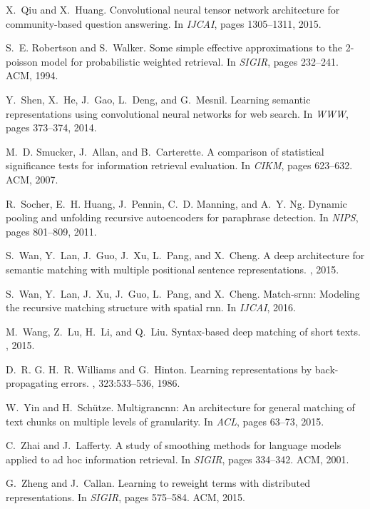 \documentclass{sig-alternate-05-2015}
\begin{document}
\begin{thebibliography}{10}
X.~Qiu and X.~Huang.
\newblock Convolutional neural tensor network architecture for community-based
  question answering.
\newblock In {\em IJCAI}, pages 1305--1311, 2015.

S.~E. Robertson and S.~Walker.
\newblock Some simple effective approximations to the 2-poisson model for
  probabilistic weighted retrieval.
\newblock In {\em SIGIR}, pages 232--241. ACM, 1994.

Y.~Shen, X.~He, J.~Gao, L.~Deng, and G.~Mesnil.
\newblock Learning semantic representations using convolutional neural networks
  for web search.
\newblock In {\em WWW}, pages 373--374, 2014.

M.~D. Smucker, J.~Allan, and B.~Carterette.
\newblock A comparison of statistical significance tests for information
  retrieval evaluation.
\newblock In {\em CIKM}, pages 623--632. ACM, 2007.

R.~Socher, E.~H. Huang, J.~Pennin, C.~D. Manning, and A.~Y. Ng.
\newblock Dynamic pooling and unfolding recursive autoencoders for paraphrase
  detection.
\newblock In {\em NIPS}, pages 801--809, 2011.

S.~Wan, Y.~Lan, J.~Guo, J.~Xu, L.~Pang, and X.~Cheng.
\newblock A deep architecture for semantic matching with multiple positional
  sentence representations.
, 2015.

S.~Wan, Y.~Lan, J.~Xu, J.~Guo, L.~Pang, and X.~Cheng.
\newblock Match-srnn: Modeling the recursive matching structure with spatial
  rnn.
\newblock In {\em IJCAI}, 2016.

M.~Wang, Z.~Lu, H.~Li, and Q.~Liu.
\newblock Syntax-based deep matching of short texts.
, 2015.

D.~R. G. H.~R. Williams and G.~Hinton.
\newblock Learning representations by back-propagating errors.
, 323:533--536, 1986.

W.~Yin and H.~Sch{\"u}tze.
\newblock Multigrancnn: An architecture for general matching of text chunks on
  multiple levels of granularity.
\newblock In {\em ACL}, pages 63--73, 2015.

C.~Zhai and J.~Lafferty.
\newblock A study of smoothing methods for language models applied to ad hoc
  information retrieval.
\newblock In {\em SIGIR}, pages 334--342. ACM, 2001.

G.~Zheng and J.~Callan.
\newblock Learning to reweight terms with distributed representations.
\newblock In {\em SIGIR}, pages 575--584. ACM, 2015.

\end{thebibliography}
\end{document}
